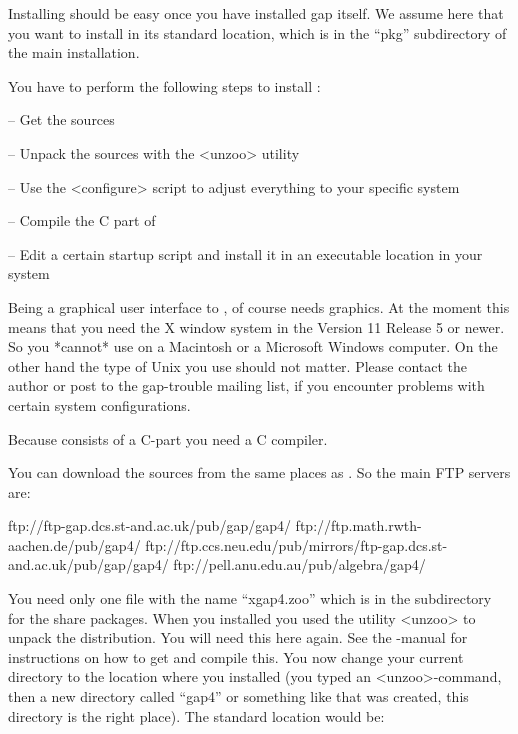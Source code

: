 
Installing {\XGAP} should be easy once you have installed gap itself. We
assume here that you want to install {\XGAP} in its standard location,
which is in the ``pkg'' subdirectory of the main {} installation.


You have to perform the following steps to install {\XGAP}:

\beginlist
\item{--} Get the sources
\item{--} Unpack the sources with the <unzoo> utility
\item{--} Use the <configure> script to adjust everything to your specific
  system
\item{--} Compile the C part of {\XGAP}
\item{--} Edit a certain startup script and install it in an executable
      location in your system
\endlist


Being a graphical user interface to {\GAP}, {\XGAP} of course needs
graphics. At the moment this means that you need the X window system in the 
Version 11 Release 5 or newer. So you *cannot* use {\XGAP} on a Macintosh
or a Microsoft Windows computer. On the other hand the type of Unix you use 
should not matter. Please contact the author or post to the gap-trouble
mailing list, if you encounter problems with certain system configurations.

Because {\XGAP} consists of a C-part you need a C compiler.


You can download the sources from the same places as {\GAP}. So the main
FTP servers are:

\begintt
ftp://ftp-gap.dcs.st-and.ac.uk/pub/gap/gap4/
ftp://ftp.math.rwth-aachen.de/pub/gap4/
ftp://ftp.ccs.neu.edu/pub/mirrors/ftp-gap.dcs.st-and.ac.uk/pub/gap/gap4/
ftp://pell.anu.edu.au/pub/algebra/gap4/
\endtt

You need only one file with the name ``xgap4.zoo''
which is in the subdirectory for the share packages.
When you installed {\GAP} you used the utility <unzoo> to unpack the
distribution. You will need this here again. See the {\GAP}-manual for
instructions on how to get and compile this.
You now change your current directory to the location where you installed
{\GAP} (you typed an <unzoo>-command, then a new directory called
``gap4'' or something like that was created, this directory is the right
place). The standard location would be:

